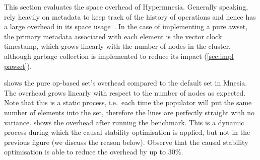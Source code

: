 This section evaluates the space overhead of Hypermnesia. Generally speaking,
 rely heavily on metadata to keep track of the history of
operations and hence has a large overhead in its space usage~\cite{bauwens2019crdtmemory}. 
In the case of implementing a pure \acrshort{awset}, the primary
metadata associated with each element is the vector clock timestamp, which
grows linearly with the number of nodes in the cluster, although
garbage collection is implemented to reduce its impact (\cref{sec:impl pawset}).

 shows the pure op-based set's overhead
compared to the default set in Mnesia. The overhead grows linearly with respect
to the number of nodes as expected. Note that this is a static process, i.e.\ each
time the populator will put the same number of elements into the set, therefore
the lines are perfectly straight with no variance.
 shows the
overhead after running the benchmark. This is a dynamic process during which
the causal stability optimisation is applied, but not in the previous
figure (we discuss the reason below). Observe that the causal stability optimisation
is able to reduce the overhead by up to \(30\%\).

